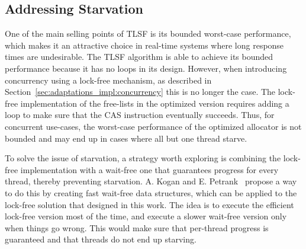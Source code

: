 \subsection{Addressing Starvation}
\label{sec:future-work:starvation}

One of the main selling points of TLSF is its bounded worst-case performance, which makes it an attractive choice in real-time systems where long response times are undesirable. The TLSF algorithm is able to achieve its bounded performance because it has no loops in its design. However, when introducing concurrency using a lock-free mechanism, as described in Section~\ref{sec:adaptations_impl:concurrency} this is no longer the case. The lock-free implementation of the free-lists in the optimized version requires adding a loop to make sure that the CAS instruction eventually succeeds. Thus, for concurrent use-cases, the worst-case performance of the optimized allocator is not bounded and may end up in cases where all but one thread starve. 

To solve the issue of starvation, a strategy worth exploring is combining the lock-free implementation with a wait-free one that guarantees progress for every thread, thereby preventing starvation. A. Kogan and E. Petrank~\cite{fast_wait_free} propose a way to do this by creating fast wait-free data structures, which can be applied to the lock-free solution that designed in this work. The idea is to execute the efficient lock-free version most of the time, and execute a slower wait-free version only when things go wrong. This would make sure that per-thread progress is guaranteed and that threads do not end up starving.

